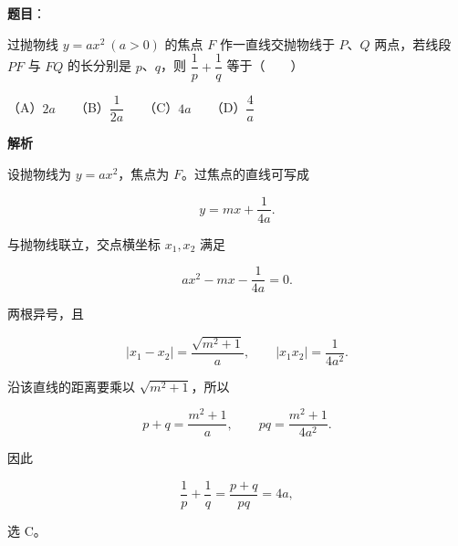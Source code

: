 \begin{answer}

\textbf{题目}：

过抛物线 $y=ax^2\ (a>0)$ 的焦点 $F$ 作一直线交抛物线于 $P$、$Q$ 两点，若线段 $PF$ 与 $FQ$ 的长分别是 $p$、$q$，则 $\dfrac1p+\dfrac1q$ 等于\mbox{（　　）}

（A）$2a$　　（B）$\dfrac1{2a}$　　（C）$4a$　　（D）$\dfrac4a$

\textbf{解析}

设抛物线为 $y=ax^2$，焦点为 $F$。过焦点的直线可写成

\nopagebreak[4]
\[
y=mx+\frac1{4a}.
\]

与抛物线联立，交点横坐标 $x_1,x_2$ 满足

\nopagebreak[4]
\[
ax^2-mx-\frac1{4a}=0.
\]

两根异号，且

\nopagebreak[4]
\[
|x_1-x_2|=\frac{\sqrt{m^2+1}}a,
\qquad |x_1x_2|=\frac1{4a^2}.
\]

沿该直线的距离要乘以 $\sqrt{m^2+1}$，所以

\nopagebreak[4]
\[
p+q=\frac{m^2+1}{a},
\qquad pq=\frac{m^2+1}{4a^2}.
\]

因此

\nopagebreak[4]
\[
\frac1p+\frac1q=\frac{p+q}{pq}=4a,
\]

选 C。


\end{answer}
